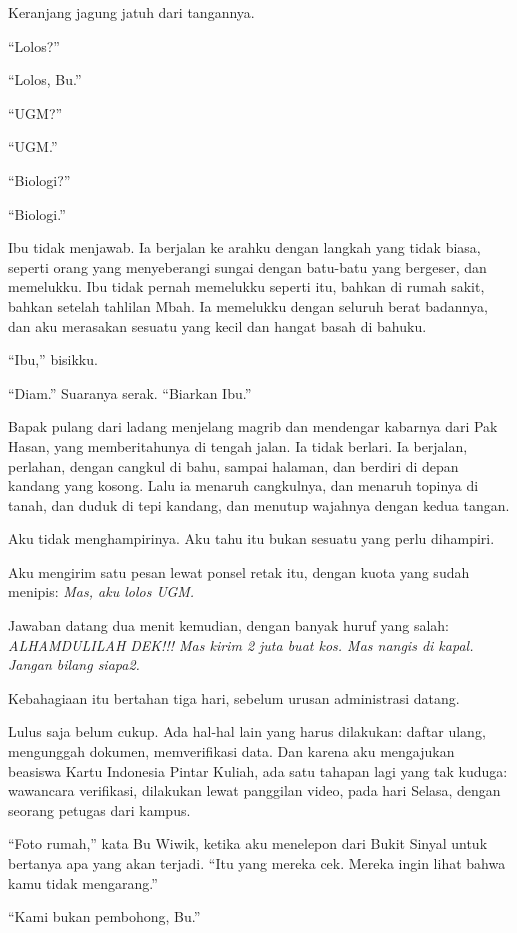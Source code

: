 \documentclass[11pt,twoside,openany]{book}
\makeatletter
\newcommand{\scenebreak}{\par\vspace{0.9em}{\centering\textsc{*\hspace{0.7em}*\hspace{0.7em}*}\par}\vspace{0.9em}\@afterindentfalse\@afterheading}
\makeatother
\begin{document}
Keranjang jagung jatuh dari tangannya.

``Lolos?''

``Lolos, Bu.''

``UGM?''

``UGM.''

``Biologi?''

``Biologi.''

Ibu tidak menjawab. Ia berjalan ke arahku dengan langkah yang tidak biasa, seperti orang yang menyeberangi sungai dengan batu-batu yang bergeser, dan memelukku. Ibu tidak pernah memelukku seperti itu, bahkan di rumah sakit, bahkan setelah tahlilan Mbah. Ia memelukku dengan seluruh berat badannya, dan aku merasakan sesuatu yang kecil dan hangat basah di bahuku.

``Ibu,'' bisikku.

``Diam.'' Suaranya serak. ``Biarkan Ibu.''

Bapak pulang dari ladang menjelang magrib dan mendengar kabarnya dari Pak Hasan, yang memberitahunya di tengah jalan. Ia tidak berlari. Ia berjalan, perlahan, dengan cangkul di bahu, sampai halaman, dan berdiri di depan kandang yang kosong. Lalu ia menaruh cangkulnya, dan menaruh topinya di tanah, dan duduk di tepi kandang, dan menutup wajahnya dengan kedua tangan.

Aku tidak menghampirinya. Aku tahu itu bukan sesuatu yang perlu dihampiri.

Aku mengirim satu pesan lewat ponsel retak itu, dengan kuota yang sudah menipis: \emph{Mas, aku lolos UGM.}

Jawaban datang dua menit kemudian, dengan banyak huruf yang salah: \emph{ALHAMDULILAH DEK!!! Mas kirim 2 juta buat kos. Mas nangis di kapal. Jangan bilang siapa2.}

\scenebreak
Kebahagiaan itu bertahan tiga hari, sebelum urusan administrasi datang.

Lulus saja belum cukup. Ada hal-hal lain yang harus dilakukan: daftar ulang, mengunggah dokumen, memverifikasi data. Dan karena aku mengajukan beasiswa Kartu Indonesia Pintar Kuliah, ada satu tahapan lagi yang tak kuduga: wawancara verifikasi, dilakukan lewat panggilan video, pada hari Selasa, dengan seorang petugas dari kampus.

``Foto rumah,'' kata Bu Wiwik, ketika aku menelepon dari Bukit Sinyal untuk bertanya apa yang akan terjadi. ``Itu yang mereka cek. Mereka ingin lihat bahwa kamu tidak mengarang.''

``Kami bukan pembohong, Bu.''
\end{document}
